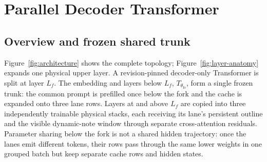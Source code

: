 \documentclass[10pt]{article}
\begin{document}
\section{Parallel Decoder Transformer}
\label{sec:architecture}

\subsection{Overview and frozen shared trunk}

Figure~\ref{fig:architecture} shows the complete topology;
Figure~\ref{fig:layer-anatomy} expands one physical upper layer. A
revision-pinned decoder-only Transformer is split at layer \(L_f\). The
embedding and layers below \(L_f\), \(T_{\theta_{\mathrm{lo}}}\), form a
single frozen trunk: the common prompt is prefilled once below the fork and
the cache is expanded onto three lane rows. Layers at and above \(L_f\) are
copied into three independently trainable physical stacks, each receiving its
lane's persistent outline and the visible dynamic-note window through
separate cross-attention residuals. Parameter sharing below the fork is not a
shared hidden trajectory: once the lanes emit different tokens, their rows
pass through the same lower weights in one grouped batch but keep separate
cache rows and hidden states.
\end{document}
